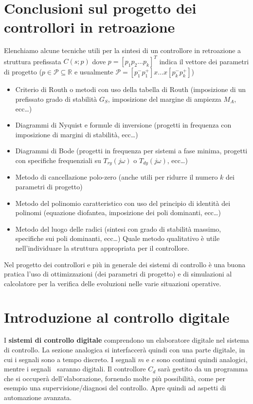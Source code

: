 \documentclass[11pt]{article}
\begin{document}
\section{Conclusioni sul progetto dei controllori in retroazione}
Elenchiamo alcune tecniche utili per la sintesi di un controllore in retroazione a struttura prefissata $C(s;p)$ dove $p=[p_1p_2\dots p_k]^T$ indica il vettore dei parametri di progetto ($p \in \mathcal{P} \subseteq \mathbb{R}$ e usualmente $\mathcal{P}=[p_1^{-}p_1^+]x\dots x[p_k^-p_k^+]$)
\begin{itemize}
    \item Criterio di Routh o metodi con uso della tabella di Routh (imposizione di un prefissato grado di stabilità $G_S$, imposizione del margine di ampiezza $M_A$, ecc\dots)
    \item Diagrammi di Nyquist e formule di inversione (progetti in frequenza con imposizione di margini di stabilità, ecc\dots)
    \item Diagrammi di Bode (progetti in frequenza per sistemi a fase minima, progetti con specifiche frequenziali su $T_{ry}(j\omega)$ o $T_{dy}(j\omega)$, ecc\dots)
    \item Metodo di cancellazione polo-zero (anche utili per ridurre il numero $k$ dei parametri di progetto)
    \item Metodo del polinomio caratteristico con uso del principio di identità dei polinomi (equazione diofantea, imposizione dei poli dominanti, ecc\dots)
    \item Metodo del luogo delle radici (sintesi con grado di stabilità massimo, specifiche sui poli dominanti, ecc\dots) Quale metodo qualitativo è utile nell'individuare la struttura appropriata per il controllore.
\end{itemize}
Nel progetto dei controllori e più in generale dei sistemi di controllo è una buona pratica l'uso di ottimizzazioni (dei parametri di progetto) e di simulazioni al calcolatore per la verifica delle evoluzioni nelle varie situazioni operative.
\section{Introduzione al controllo digitale}
I \textbf{sistemi di controllo digitale} comprendono un elaboratore digitale nel sistema di controllo.
La sezione analogica si interfaccerà quindi con una parte digitale, in cui i segnali sono a tempo discreto. I segnali $m$ e $c$ sono continui quindi analogici, mentre i segnali $~$ saranno digitali. Il controllore $C_d$ sarà gestito da un programma che si occuperà dell'elaborazione, fornendo molte più possibilità, come per esempio una supervisione/diagnosi del controllo. Apre quindi ad aspetti di automazione avanzata.
\end{document}

